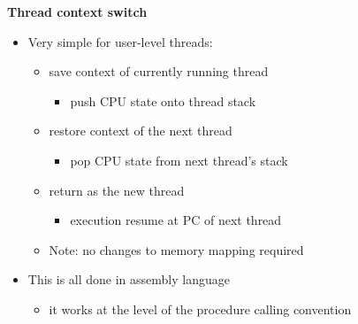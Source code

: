 \documentclass[11pt,a4paper]{article}
\begin{document}
\textbf{Thread context switch}
\begin{itemize}
    \item Very simple for user-level threads:
        \begin{itemize}
            \item save context of currently running thread
                \begin{itemize}
                    \item push CPU state onto thread stack
                \end{itemize}
            \item restore context of the next thread
                \begin{itemize}
                    \item pop CPU state from next thread's stack
                \end{itemize}
            \item return as the new thread
                \begin{itemize}
                    \item execution resume at PC of next thread
                \end{itemize}
            \item Note: no changes to memory mapping required
        \end{itemize}
    \item This is all done in assembly language
        \begin{itemize}
            \item it works at the level of the procedure calling convention
        \end{itemize}
\end{itemize}
\end{document}

